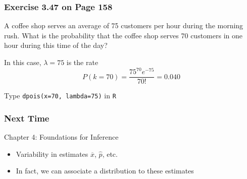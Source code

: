 \documentclass[handout]{beamer}
\newcommand{\blue}[1]{\textcolor{blue2}{#1}}
\begin{document}
\begin{frame}
\frametitle{Exercise 3.47 on Page 158}
A coffee shop serves an average of 75 customers per hour during the morning rush.  What is the probability that the coffee shop serves 70 customers in one hour during this time of the day?

\vspace{0.5cm}

\pause In this case, $\lambda=75$ is the rate
\[
P(k=70) = \frac{75^{70} e^{-75}}{70!} = 0.040
\]

\pause\vspace{0.25cm}

Type {\tt dpois(x=70, lambda=75)} in {\tt R}

\end{frame}


\begin{frame}[fragile]
\frametitle{Next Time}

Chapter 4:  Foundations for Inference
\begin{itemize}
\item Variability in estimates $\overline{x}$, $\widehat{p}$, etc.
\item In fact, we can associate a \blue{distribution} to these estimates
\end{itemize}


\end{frame}
\end{document}
